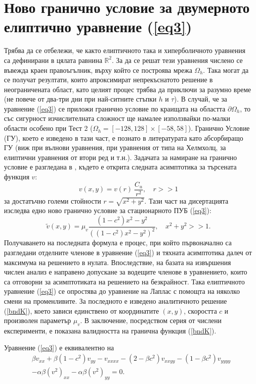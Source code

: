 \documentclass{article}
\newcommand{\be}{\begin{equation}}
\newcommand{\ee}{\end{equation}}
\newcommand{\rf}[1]{(\ref{#1})}
\newcommand{\RR}{\mathbb{R}}
\begin{document}
\section{Ново гранично условие за двумерното елиптично уравнение \rf{eq3}}
Трябва да се отбележи, че както елиптичното така и хиперболичното уравнения са дефинирани в цялата равнина $\RR^2$. За да се решат тези уравнения числено се въвежда краен правоъгълник, върху който се построява мрежа $\Omega_h$. Така могат да се получат резултати, които апроксимират непрекъснатото решение в неограничената област, като целият процес трябва да приключи за разумно време (не повече от два-три дни при най-ситните стъпки $h$ и $\tau$). В случай, че за уравнение \rf{eq3} се приложи гранично условие по краищата на областта $\partial \Omega_h$, то със сигурност изчислителната сложност ще намалее използвайки по-малки области особено при Тест 2 ($\Omega_h = [-128, 128] \times [-58, 58]$). Гранично Условие (ГУ), което е изведено в тази част, е познато в литературата като абсорбиращо ГУ (виж \cite{ref31} при вълнови уравнения, \cite{ref32} при уравнения от типа на Хелмхолц, \cite{ref33} за елиптични уравнения от втори ред и т.н.). Задачата за намиране на гранично условие е разгледана в \cite{ref116}, където е открита следната асимптотика за търсената функция $v$:
\be
v(x,y) = v(r) ~ \frac{C_u}{r^2}, \quad r>>1
\ee
за достатъчно големи стойности $r = \sqrt{x^2 + y^2}$. Тази част на дисертацията изследва едно ново гранично условие за стационарното ПУБ \rf{eq3}:
\be\label{bndK}
\tilde v(x,y) = \mu_v \frac{ (1-c^2)x^2 - y^2}{ ((1-c^2)x^2 - y^2)^2}, \quad x^2 + y^2 >> 1.
\ee
Получаването на последната формула е процес, при който първоначално са разгледани отделните членове в уравнение \rf{eq3} и тяхната асимптотика далеч от максимума на решението в нулата. Впоследствие, на базата на извършения числен анализ е направено допускане за водещите членове в уравнението, които са отговорни за асимптотиката на решението на безкрайност. Така елиптичното уравнение \rf{eq3} се опростява до уравнение на Лаплас с помощта на няколко смени на променливите. За последното е изведено аналитичното решение \rf{bndK}, което зависи единствено от координатите $(x,y)$, скоростта $c$ и произволен параметър $\mu_v$. В заключение, посредством серия от числени експерименти, е показана валидността на гранична функция \rf{bndK}. 

Уравнение \rf{eq3} е еквивалентно на 
\begin{align}\label{eq3full}
&\beta v_{xx} + \beta (1-c^2) v_{yy} - v_{xxxx} - (2-\beta c^2)v_{xxyy} - (1-\beta c^2)v_{yyyy} \nonumber \\ 
&- \alpha \beta (v^2)_{xx} - \alpha \beta (v^2)_{yy}  =0.
\end{align}
\end{document}
